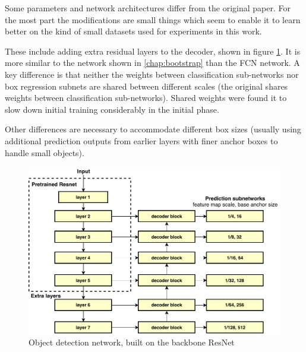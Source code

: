 Some parameters and network architectures differ from the original paper. For the most part the modifications are small things which seem to enable it to learn better on the kind of small datasets used for experiments in this work. 

These include adding extra residual layers to the decoder, shown in figure \ref{fig:detection_network}. It is more similar to the network shown in  \ref{chap:bootstrap} than the \gls{FCN} network. A key difference is that neither the weights between classification sub-networks nor box regression subnets are shared between different scales  (the original shares weights between classification sub-networks). Shared weights were found it to slow down initial training considerably in the initial phase. 

Other differences are necessary to accommodate different box sizes (usually using additional prediction outputs from earlier layers with finer anchor boxes to handle small objects).


\begin{figure}[h]
  \centering
  \includegraphics[width=1.0\linewidth]{figures/annotation/detection_network.pdf}
  \caption{Object detection network, built on the backbone ResNet }  
  \label{fig:detection_network}
\end{figure}


